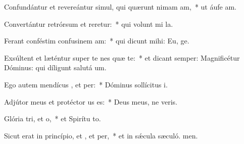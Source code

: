 \item Confundántur et revereántur simul, qui quærunt nimam am,~* ut áufe am.
\item Convertántur retrórsum et reretur:~* qui volunt mi la.
\item Ferant conféstim confusinem am:~* qui dicunt mihi: Eu, ge.
\item Exsúltent et læténtur super te nes quæ te:~* et dicant semper: Magnificétur Dóminus: qui díligunt salutá um.
\item Ego autem mendícus , et per:~* Dóminus sollícitus  i.
\item Adjútor meus et protéctor us  es:~* Deus meus, ne veris.
\item Glória tri, et o,~* et Spirítu to.
\item Sicut erat in princípio, et , et per,~* et in sǽcula sæculó. men.
